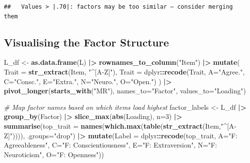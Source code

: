 \documentclass[
]{article}
\newenvironment{Shaded}{\begin{snugshade}}{\end{snugshade}}
\newcommand{\AttributeTok}[1]{\textcolor[rgb]{0.13,0.29,0.53}{#1}}
\newcommand{\CommentTok}[1]{\textcolor[rgb]{0.56,0.35,0.01}{\textit{#1}}}
\newcommand{\DecValTok}[1]{\textcolor[rgb]{0.00,0.00,0.81}{#1}}
\newcommand{\FunctionTok}[1]{\textcolor[rgb]{0.13,0.29,0.53}{\textbf{#1}}}
\newcommand{\NormalTok}[1]{#1}
\newcommand{\OtherTok}[1]{\textcolor[rgb]{0.56,0.35,0.01}{#1}}
\newcommand{\SpecialCharTok}[1]{\textcolor[rgb]{0.81,0.36,0.00}{\textbf{#1}}}
\newcommand{\StringTok}[1]{\textcolor[rgb]{0.31,0.60,0.02}{#1}}
\begin{document}
\begin{verbatim}
##   Values > |.70|: factors may be too similar — consider merging them
\end{verbatim}

\subsection{Visualising the Factor
Structure}\label{visualising-the-factor-structure}

\begin{Shaded}
\begin{Highlighting}[]
\NormalTok{L\_df }\OtherTok{\textless{}{-}} \FunctionTok{as.data.frame}\NormalTok{(L) }\SpecialCharTok{|\textgreater{}}
  \FunctionTok{rownames\_to\_column}\NormalTok{(}\StringTok{"Item"}\NormalTok{) }\SpecialCharTok{|\textgreater{}}
  \FunctionTok{mutate}\NormalTok{(}
    \AttributeTok{Trait =} \FunctionTok{str\_extract}\NormalTok{(Item, }\StringTok{"\^{}[A{-}Z]"}\NormalTok{),}
    \AttributeTok{Trait =}\NormalTok{ dplyr}\SpecialCharTok{::}\FunctionTok{recode}\NormalTok{(Trait, }\AttributeTok{A=}\StringTok{"Agree."}\NormalTok{, }\AttributeTok{C=}\StringTok{"Consc."}\NormalTok{, }\AttributeTok{E=}\StringTok{"Extra."}\NormalTok{, }\AttributeTok{N=}\StringTok{"Neuro."}\NormalTok{, }\AttributeTok{O=}\StringTok{"Open."}\NormalTok{)}
\NormalTok{  ) }\SpecialCharTok{|\textgreater{}}
  \FunctionTok{pivot\_longer}\NormalTok{(}\FunctionTok{starts\_with}\NormalTok{(}\StringTok{"MR"}\NormalTok{), }\AttributeTok{names\_to=}\StringTok{"Factor"}\NormalTok{, }\AttributeTok{values\_to=}\StringTok{"Loading"}\NormalTok{)}

\CommentTok{\# Map factor names based on which items load highest}
\NormalTok{factor\_labels }\OtherTok{\textless{}{-}}\NormalTok{ L\_df }\SpecialCharTok{|\textgreater{}}
  \FunctionTok{group\_by}\NormalTok{(Factor) }\SpecialCharTok{|\textgreater{}}
  \FunctionTok{slice\_max}\NormalTok{(}\FunctionTok{abs}\NormalTok{(Loading), }\AttributeTok{n=}\DecValTok{3}\NormalTok{) }\SpecialCharTok{|\textgreater{}}
  \FunctionTok{summarise}\NormalTok{(}\AttributeTok{top\_trait =} \FunctionTok{names}\NormalTok{(}\FunctionTok{which.max}\NormalTok{(}\FunctionTok{table}\NormalTok{(}\FunctionTok{str\_extract}\NormalTok{(Item,}\StringTok{"\^{}[A{-}Z]"}\NormalTok{)))),}
            \AttributeTok{.groups=}\StringTok{"drop"}\NormalTok{) }\SpecialCharTok{|\textgreater{}}
  \FunctionTok{mutate}\NormalTok{(}\AttributeTok{Label =}\NormalTok{ dplyr}\SpecialCharTok{::}\FunctionTok{recode}\NormalTok{(top\_trait,}
    \AttributeTok{A=}\StringTok{"F: Agreeableness"}\NormalTok{, }\AttributeTok{C=}\StringTok{"F: Conscientiousness"}\NormalTok{,}
    \AttributeTok{E=}\StringTok{"F: Extraversion"}\NormalTok{,  }\AttributeTok{N=}\StringTok{"F: Neuroticism"}\NormalTok{, }\AttributeTok{O=}\StringTok{"F: Openness"}\NormalTok{))}


\end{Highlighting}
\end{Shaded}
\end{document}
